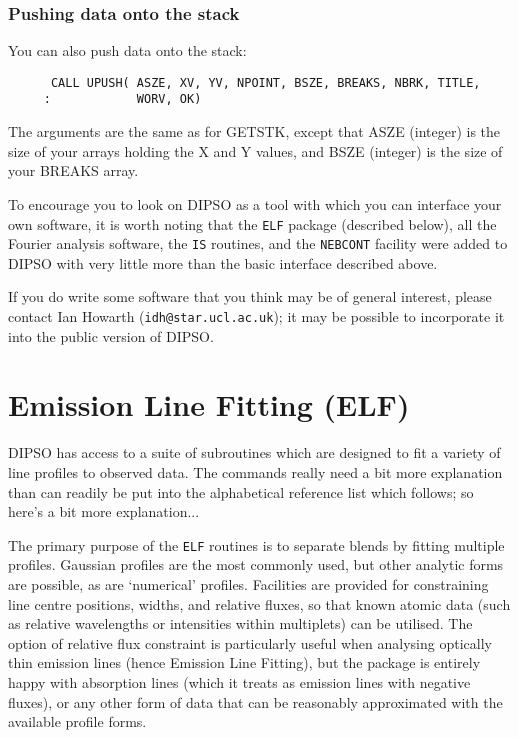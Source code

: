 \documentclass[twoside,11pt]{article}
\newcommand{\htmlref}[2]{#1}
\renewcommand{\_}{\texttt{\symbol{95}}}
\begin{document}
\subsubsection {Pushing data onto the stack}

You can also push data onto the stack:

\begin{verbatim}
      CALL UPUSH( ASZE, XV, YV, NPOINT, BSZE, BREAKS, NBRK, TITLE, 
     :            WORV, OK)
\end{verbatim}

The arguments are the same as for GETSTK, except that ASZE (integer)
is the size of your arrays holding the X and Y values, and BSZE
(integer) is the size of your BREAKS array.

To encourage you to look on DIPSO as a tool with which you can interface
your own software, it is worth noting that the {\tt{ELF}}  package
(described below), all the Fourier analysis software, the {\tt{IS}} 
routines, and the \htmlref{{\tt{NEBCONT}}}{COM:NEBCONT}  facility were added to DIPSO with very
little more than the basic interface described above.

If you do write some software that you think may be of general interest, please
contact Ian Howarth ({\tt{idh@star.ucl.ac.uk}});  it may be
possible to incorporate it into the public version of DIPSO.

\section {Emission Line Fitting (ELF)}

DIPSO has access to a suite of subroutines which are designed to fit a
variety of line profiles to observed data. The commands really need a
bit more explanation than can readily be put into the alphabetical
reference list which follows; so here's a bit more explanation...

The primary purpose of the {\tt{ELF}}  routines is to separate blends by
fitting multiple profiles. Gaussian profiles are the most commonly
used, but other analytic forms are possible, as are `numerical'
profiles. Facilities are provided for constraining line centre
positions, widths, and relative fluxes, so that known atomic data
(such as relative wavelengths or intensities within multiplets) can be
utilised. The option of relative flux constraint is particularly
useful when analysing optically thin emission lines (hence Emission
Line Fitting), but the package is entirely happy with absorption lines
(which it treats as emission lines with negative fluxes), or any other
form of data that can be reasonably approximated with the available
profile forms.
\end{document}

